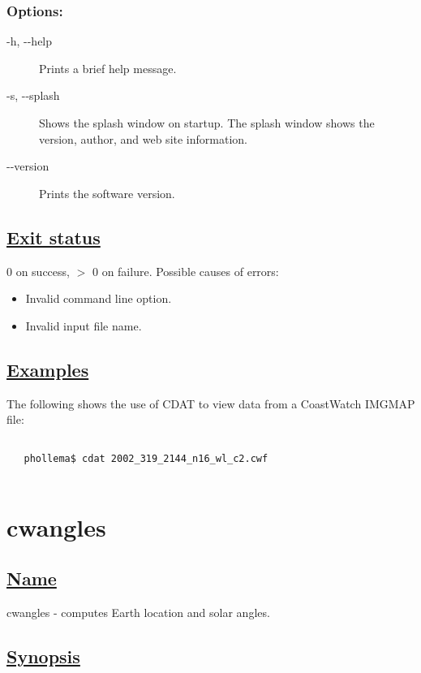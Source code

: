 \subsubsection*{Options:}
\begin{description}
\item[-h, -{-}help]Prints a brief help message.
\item[-s, -{-}splash]Shows the splash window on startup. The splash window shows the version, author, and web site information.
\item[-{-}version]Prints the software version.

\end{description}
\subsection*{\underline{Exit status}}


 0 on success, $>$ 0 on failure. Possible causes of errors:
\begin{itemize}
\item  Invalid command line option. 
\item  Invalid input file name. 

\end{itemize}
\subsection*{\underline{Examples}}


 The following shows the use of CDAT to view data from a CoastWatch IMGMAP file:
\begin{verbatim}

   phollema$ cdat 2002_319_2144_n16_wl_c2.cwf
 
\end{verbatim}

\newpage
\section{cwangles} \hypertarget{cwangles}{}
\subsection*{\underline{Name}}


   cwangles - computes Earth location and solar angles.  
\subsection*{\underline{Synopsis}}


